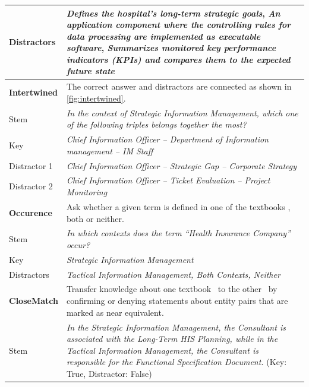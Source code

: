 \documentclass{IOS-Book-Article}     %
\newcommand{\citep}{\cite}%
\begin{document}
\begin{table}[t]
\begin{tabulary}{\columnwidth}{lL}
Distractors				&\emph{Defines the hospital’s long-term strategic goals},
						\emph{An application component where the controlling rules for data processing are implemented as executable software},
						\emph{Summarizes monitored key performance indicators (KPIs) and compares them to the expected future state}\\
\midrule
\textbf{Intertwined}	&The correct answer and distractors are connected as shown in \cref{fig:intertwined}.\\
Stem					&\emph{In the context of Strategic Information Management, which one of the following triples belongs together the most?}\\
Key						&\emph{Chief Information Officer -- Department of Information management -- IM Staff}\\
Distractor 1			&\emph{Chief Information Officer -- Strategic Gap -- Corporate Strategy}\\
Distractor 2			&\emph{Chief Information Officer -- Ticket Evaluation -- Project Monitoring}\\
\midrule
\textbf{Occurence}		&Ask whether a given term is defined in one of the textbooks \cite{bb,ob}, both or neither.\\
Stem					&\emph{In which contexts does the term \enquote{Health Insurance Company} occur?}\\
Key						&\emph{Strategic Information Management}\\
Distractors				&\emph{Tactical Information Management, Both Contexts, Neither}\\
\midrule
\textbf{CloseMatch}		&Transfer knowledge about one textbook~\citep{bb} to the other~\citep{ob} by confirming or denying statements about entity pairs that are marked as near equivalent.\\
Stem					&\emph{In the Strategic Information Management, the Consultant is associated with the Long-Term HIS Planning, while in the Tactical Information Management, the Consultant is responsible for the Functional Specification Document.} (Key: True, Distractor: False)\\
\bottomrule
\end{tabulary}
\end{table}
\end{document}

